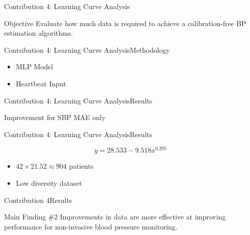 \begin{frame}{Contribution 4: Learning Curve Analysis}
    \begin{block}{Objective}
        Evaluate how much data is required to achieve a calibration-free BP estimation algorithms.
    \end{block}
\end{frame}

\begin{frame}{Contribution 4: Learning Curve Analysis}{Methodology}
    \begin{figure}
        
    \end{figure}
    \begin{itemize}
        \item MLP Model
        \item Heartbeat Input
    \end{itemize}
\end{frame}

\begin{frame}{Contribution 4: Learning Curve Analysis}{Results}
    \begin{figure}[htbp]
        
        

        
        
    \end{figure}
    Improvement for SBP MAE only
\end{frame}


\begin{frame}{Contribution 4: Learning Curve Analysis}{Results}

    \begin{equation}\label{eq:fitted curve}
        y=\num{28.533} - \num{9.518} x^{\num{0.295}}
    \end{equation}
    \begin{figure}[htbp]
        
    \end{figure}

    \pause
    \begin{itemize}
        \item $42 \times 21.52 \approx 904$ patients
        \item Low diversity dataset
    \end{itemize}
\end{frame}

\begin{frame}{Contribution 4}{Results}
    \begin{block}{Main Finding \#2}
        Improvements in data are more effective at improving performance for non-invasive blood pressure monitoring.
    \end{block}
\end{frame}


